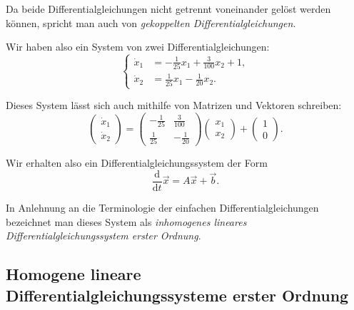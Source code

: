 Da beide Differentialgleichungen nicht getrennt voneinander
gelöst werden können, spricht man auch von
\emph{gekoppelten Differentialgleichungen}.

Wir haben also ein System von zwei Differentialgleichungen:
\[
    \left\{
    \begin{aligned}
        \dot{x}_1 & = -\frac{1}{25}x_1
        + \frac{3}{100}x_2 + 1,        \\
        \dot{x}_2 & = \frac{1}{25}x_1
        - \frac{1}{20}x_2.
    \end{aligned}
    \right.
\]

Dieses System lässt sich auch mithilfe von Matrizen und
Vektoren schreiben:
\[
    \begin{pmatrix}
        \dot{x}_1 \\
        \dot{x}_2
    \end{pmatrix}
    =
    \begin{pmatrix}
        -\frac{1}{25} & \frac{3}{100} \\
        \frac{1}{25}  & -\frac{1}{20}
    \end{pmatrix}
    \begin{pmatrix}
        x_1 \\
        x_2
    \end{pmatrix}
    +
    \begin{pmatrix}
        1 \\
        0
    \end{pmatrix}.
\]

Wir erhalten also ein Differentialgleichungssystem der Form
\[
    \frac{\mathrm{d}}{\mathrm{d}t}\vec{x}
    = A\vec{x}+\vec{b}.
\]

In Anlehnung an die Terminologie der einfachen
Differentialgleichungen bezeichnet man dieses System als
\emph{inhomogenes lineares Differentialgleichungssystem
    erster Ordnung}.





























\clearpage
\subsection{Homogene lineare Differentialgleichungssysteme erster Ordnung}

